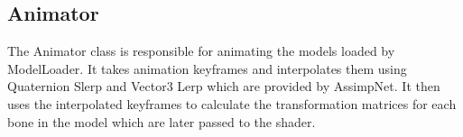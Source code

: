 \subsection{Animator}

The Animator class is responsible for animating the models loaded by ModelLoader.
It takes animation keyframes and interpolates them using Quaternion Slerp and Vector3 Lerp which are provided by AssimpNet.
It then uses the interpolated keyframes to calculate the transformation matrices for each bone in the model which are later passed to the shader.